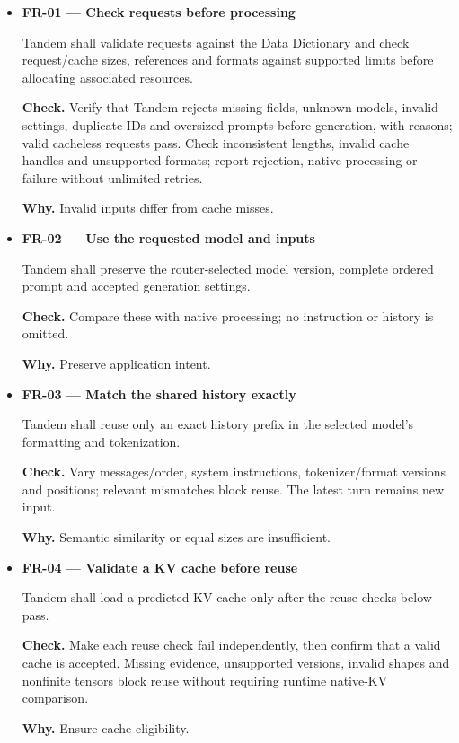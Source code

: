 \documentclass[12pt]{article}
\begin{document}
\begin{itemize}
\item {}\label{req:FR-01}
\textbf{FR-01 --- Check requests before processing}\par
Tandem shall validate requests against the Data Dictionary and check request/cache sizes, references and formats against supported limits before allocating associated resources.\par
\textbf{Check.} Verify that Tandem rejects missing fields, unknown models, invalid settings, duplicate IDs and oversized prompts before generation, with reasons; valid cacheless requests pass. Check inconsistent lengths, invalid cache handles and unsupported formats; report rejection, native processing or failure without unlimited retries.\par
\textbf{Why.} Invalid inputs differ from cache misses.


\item {}\label{req:FR-02}
\textbf{FR-02 --- Use the requested model and inputs}\par
Tandem shall preserve the router-selected model version, complete ordered prompt and accepted generation settings.\par
\textbf{Check.} Compare these with native processing; no instruction or history is omitted.\par
\textbf{Why.} Preserve application intent.


\item {}\label{req:FR-03}
\textbf{FR-03 --- Match the shared history exactly}\par
Tandem shall reuse only an exact history prefix in the selected model's formatting and tokenization.\par
\textbf{Check.} Vary messages/order, system instructions, tokenizer/format versions and positions; relevant mismatches block reuse. The latest turn remains new input.\par
\textbf{Why.} Semantic similarity or equal sizes are insufficient.


\item {}\label{req:FR-04}
\textbf{FR-04 --- Validate a KV cache before reuse}\par
Tandem shall load a predicted KV cache only after the reuse checks below pass.\par
\textbf{Check.} Make each reuse check fail independently, then confirm that a valid cache is accepted. Missing evidence, unsupported versions, invalid shapes and nonfinite tensors block reuse without requiring runtime native-KV comparison.\par
\textbf{Why.} Ensure cache eligibility.



\end{itemize}
\end{document}
